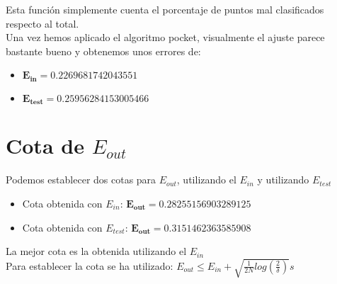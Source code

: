 Esta función simplemente cuenta el porcentaje de puntos mal clasificados respecto al total.\\
Una vez hemos aplicado el algoritmo pocket, visualmente el ajuste parece bastante bueno y obtenemos unos errores de:
\begin{itemize}
   \item $ \mathbf{E_{in} = 0.2269681742043551} $
   \item $  \mathbf{E_{test} = 0.25956284153005466} $
\end{itemize}

\section{Cota de $ E_{out} $}
Podemos establecer dos cotas para $ E_{out} $, utilizando el $ E_{in} $ y utilizando $ E_{test} $
\begin{itemize}
   \item Cota obtenida con $ E_{in} $: $ \mathbf{E_{out} = 0.28255156903289125} $
   \item Cota obtenida con $ E_{test} $: $ \mathbf{E_{out} = 0.3151462363585908} $
\end{itemize}

La mejor cota es la obtenida utilizando el $ E_{in} $\\
Para establecer la cota se ha utilizado: $ E_{out} \leq E_{in} + \sqrt{\frac{1}{2N}log(\frac{2}{\delta})}s $

